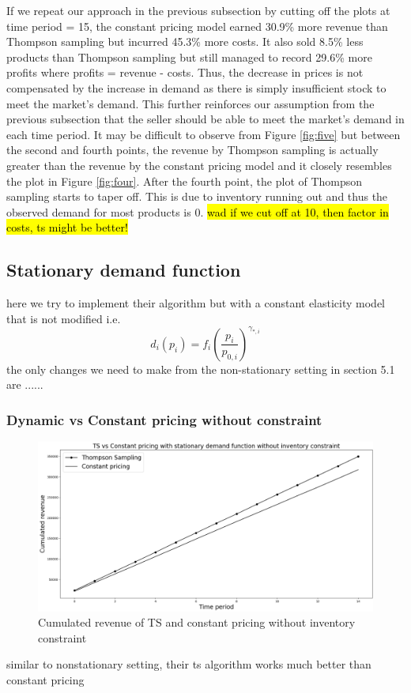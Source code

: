 \documentclass[a4paper]{article}
\begin{document}
\newline
\newline
If we repeat our approach in the previous subsection by cutting off the plots at time period = 15, the constant pricing model earned 30.9\% more revenue than Thompson sampling but incurred 45.3\% more costs. It also sold 8.5\% less products than Thompson sampling but still managed to record 29.6\% more profits where profits = revenue - costs. Thus, the decrease in prices is not compensated by the increase in demand as there is simply insufficient stock to meet the market's demand. This further reinforces our assumption from the previous subsection that the seller should be able to meet the market's demand in each time period. It may be difficult to observe from Figure \ref{fig:five} but between the second and fourth points, the revenue by Thompson sampling is actually greater than the revenue by the constant pricing model and it closely resembles the plot in Figure \ref{fig:four}. After the fourth point, the plot of Thompson sampling starts to taper off. This is due to inventory running out and thus the observed demand for most products is 0. \hl{wad if we cut off at 10, then factor in costs, ts might be better!}

\subsection{Stationary demand function}
here we try to implement their algorithm but with a constant elasticity model that is not modified i.e. 
\[d_i(p_i) = f_i \left(\frac{p_i}{p_{0,i}}\right)^{\gamma_{*,i}} \]
the only changes we need to make from the non-stationary setting in section 5.1 are ......
\subsubsection{Dynamic vs Constant pricing without constraint}
\begin{figure}[h]
	\centering
	\includegraphics[width=1.03\textwidth]{1.png}
	\caption{\label{fig:1}Cumulated revenue of TS and constant pricing without inventory constraint}
\end{figure}
similar to nonstationary setting, their ts algorithm works much better than constant pricing
\end{document}
